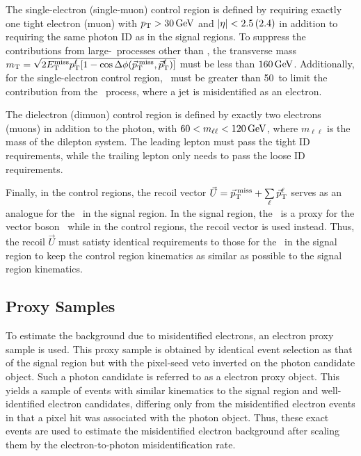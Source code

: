 The single-electron (single-muon) control region is defined by requiring exactly one tight electron (muon) with $p_{\mathrm{T}} > 30\,\text{Ge\hspace{-.08em}V}$ and $\lvert \eta \rvert < 2.5\,(2.4)$ in addition to requiring the same photon ID as in the signal regions.
To suppress the contributions from large-\met\ processes other than \wlng, the transverse mass $m_{\mathrm{T}} = \sqrt{\smash[b]{2E_{\mathrm{T}}^{\text{miss}}p_{\mathrm{T}}^{\ell}[1-\cos\Delta\phi({\vec p}_{\mathrm{T}}^{\kern2pt\text{miss}},{\vec p}_{\mathrm{T}}^{\ell})]}}$ must be less than $160\,\text{Ge\hspace{-.08em}V}$.
Additionally, for the single-electron control region, \met\ must be greater than 50\GeV\ to limit the contribution from the \gj\ process, where a jet is misidentified as an electron. %

The dielectron (dimuon) control region is defined by exactly two electrons (muons) in addition to the photon, with $60 < m_{\ell\ell} < 120\,\text{Ge\hspace{-.08em}V}$, where $m_{\ell\ell}$ is the mass of the dilepton system.
The leading lepton must pass the tight ID requirements, while the trailing lepton only needs to pass the loose ID requirements. 

Finally, in the control regions, the recoil vector $\vec{U} = {\vec p}_{\mathrm{T}}^{\kern2pt\text{miss}} + \sum\limits_\ell{\vec p}_{\mathrm{T}}^{\ell}$ serves as an analogue for the \ptvecmiss\ in the signal region.
In the signal region, the \ptvecmiss\ is a proxy for the vector boson \pt\ while in the control regions, the recoil vector is used instead. 
Thus, the recoil $\vec{U}$ must satisty identical requirements to those for the \ptvecmiss\ in the signal region to keep the control region kinematics as similar as possible to the signal region kinematics.

\subsection{Proxy Samples}
\label{sec:proxy_samples}

To estimate the background due to misidentified electrons, an electron proxy sample is used.
This proxy sample is obtained by identical event selection as that of the signal region but with the pixel-seed veto inverted on the photon candidate object.
Such a photon candidate is referred to as a electron proxy object.
This yields a sample of events with similar kinematics to the signal region and well-identified electron candidates, differing only from the misidentified electron events in that a pixel hit was associated with the photon object.
Thus, these exact events are used to estimate the misidentified electron background after scaling them by the electron-to-photon misidentification rate.

